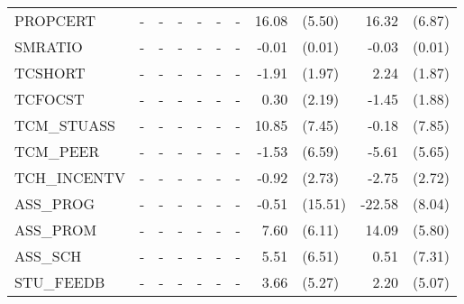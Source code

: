 \documentclass[10pt]{article}
\begin{document}
\begin{table}[htbp]
\begin{tabular}{lrlrlrlrlrl}
     	PROPCERT & \multicolumn{1}{c}{-} & \multicolumn{1}{c}{-} & \multicolumn{1}{c}{-} & \multicolumn{1}{c}{-} & \multicolumn{1}{c}{-} & \multicolumn{1}{c}{-} & 16.08 & (5.50) & 16.32 & (6.87) \\[0.2em]
     	SMRATIO & \multicolumn{1}{c}{-} & \multicolumn{1}{c}{-} & \multicolumn{1}{c}{-} & \multicolumn{1}{c}{-} & \multicolumn{1}{c}{-} & \multicolumn{1}{c}{-} & -0.01 & (0.01) & -0.03 & (0.01) \\[0.2em]
     	TCSHORT & \multicolumn{1}{c}{-} & \multicolumn{1}{c}{-} & \multicolumn{1}{c}{-} & \multicolumn{1}{c}{-} & \multicolumn{1}{c}{-} & \multicolumn{1}{c}{-} & -1.91 & (1.97) & 2.24  & (1.87) \\[0.2em]
     	TCFOCST & \multicolumn{1}{c}{-} & \multicolumn{1}{c}{-} & \multicolumn{1}{c}{-} & \multicolumn{1}{c}{-} & \multicolumn{1}{c}{-} & \multicolumn{1}{c}{-} & 0.30  & (2.19) & -1.45 & (1.88) \\[0.2em]
     	TCM\_STUASS & \multicolumn{1}{c}{-} & \multicolumn{1}{c}{-} & \multicolumn{1}{c}{-} & \multicolumn{1}{c}{-} & \multicolumn{1}{c}{-} & \multicolumn{1}{c}{-} & 10.85 & (7.45) & -0.18 & (7.85) \\[0.2em]
     	TCM\_PEER & \multicolumn{1}{c}{-} & \multicolumn{1}{c}{-} & \multicolumn{1}{c}{-} & \multicolumn{1}{c}{-} & \multicolumn{1}{c}{-} & \multicolumn{1}{c}{-} & -1.53 & (6.59) & -5.61 & (5.65) \\[0.2em]
     	TCH\_INCENTV & \multicolumn{1}{c}{-} & \multicolumn{1}{c}{-} & \multicolumn{1}{c}{-} & \multicolumn{1}{c}{-} & \multicolumn{1}{c}{-} & \multicolumn{1}{c}{-} & -0.92 & (2.73) & -2.75 & (2.72) \\[0.2em]
     	ASS\_PROG & \multicolumn{1}{c}{-} & \multicolumn{1}{c}{-} & \multicolumn{1}{c}{-} & \multicolumn{1}{c}{-} & \multicolumn{1}{c}{-} & \multicolumn{1}{c}{-} & -0.51 & (15.51) & -22.58 & (8.04) \\[0.2em]
     	ASS\_PROM & \multicolumn{1}{c}{-} & \multicolumn{1}{c}{-} & \multicolumn{1}{c}{-} & \multicolumn{1}{c}{-} & \multicolumn{1}{c}{-} & \multicolumn{1}{c}{-} & 7.60  & (6.11) & 14.09 & (5.80) \\[0.2em]
     	ASS\_SCH & \multicolumn{1}{c}{-} & \multicolumn{1}{c}{-} & \multicolumn{1}{c}{-} & \multicolumn{1}{c}{-} & \multicolumn{1}{c}{-} & \multicolumn{1}{c}{-} & 5.51  & (6.51) & 0.51  & (7.31) \\[0.2em]
     	STU\_FEEDB & \multicolumn{1}{c}{-} & \multicolumn{1}{c}{-} & \multicolumn{1}{c}{-} & \multicolumn{1}{c}{-} & \multicolumn{1}{c}{-} & \multicolumn{1}{c}{-} & 3.66  & (5.27) & 2.20  & (5.07) \\[0.2em]

\end{tabular}
\end{table}
\end{document}
